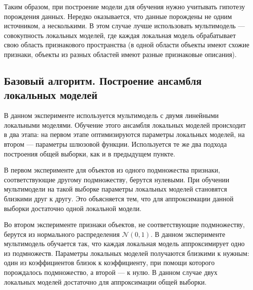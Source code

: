 \documentclass[12pt, twoside]{article}
\begin{document}
Таким образом, при построение модели для обучения нужно учитывать гипотезу порождения данных. Нередко оказывается, что данные порождены не одним источником, а несколькими. В этом случае лучше использовать мультимодель --- совокупность локальных моделей, где каждая локальная модель обрабатывает свою область признакового пространства (в одной области объекты имеют схожие признаки, объекты из разных областей имеют разные признаковые описания).

\subsection{Базовый алгоритм. Построение ансамбля локальных моделей}

В данном эксперименте используется мультимодель с двумя линейными локальными моделями. Обучение этого ансамбля локальных моделей происходит в два этапа: на первом этапе оптимизируются параметры локальных моделей, на втором --- параметры шлюзовой функции. Используется те же два подхода построения общей выборки, как и в предыдущем пункте. 

В первом эксперименте для объектов из одного подмножества признаки, соответствующие другому подмножеству, берутся нулевыми. При обучении мультимодели на такой выборке параметры локальных моделей становятся близкими друг к другу. Это объясняется тем, что для аппроксимации данной выборки достаточно одной локальной модели.

Во втором эксперименте признаки объектов, не соответствующие подмножеству, берутся из нормального распределения $\mathcal{N}(0,1)$. В данном эксперименте мультимодель обучается так, что каждая локальная модель аппроксимирует одно из подмножеств. Параметры локальных моделей получаются близкими к нужным: один из коэффициентов близок к коэффициенту, при помощи которого порождалось подмножество, а второй --- к нулю. В данном случае двух локальных моделей достаточно для аппроксимации общей выборки. 
\end{document}
